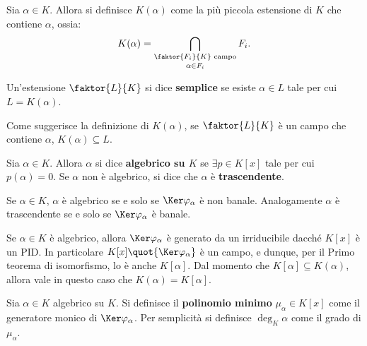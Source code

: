 \documentclass[12pt]{scrartcl}
\begin{document}
	\begin{definition}
		Sia $\alpha \in K$. Allora si definisce $K(\alpha)$
		come la più piccola estensione di $K$ che contiene
		$\alpha$, ossia:
		\[ K(\alpha) = \bigcap_{\substack{\faktor{F_i}{K} \text{ campo}	\\[0.02in] \alpha \in F_i}} F_i. \]
	\end{definition}

	\begin{definition}
		Un'estensione $\faktor{L}{K}$ si dice \textbf{semplice}
		se esiste $\alpha \in L$ tale per cui $L = K(\alpha)$.
	\end{definition}

	\begin{remark}
		Come suggerisce la definizione di $K(\alpha)$, se
		$\faktor{L}{K}$ è un campo che contiene $\alpha$,
		$K(\alpha) \subseteq L$.
	\end{remark}

	\begin{definition}
		Sia $\alpha \in K$. Allora $\alpha$ si dice \textbf{algebrico su $K$} se $\exists p \in K[x]$
		tale per cui $p(\alpha) = 0$. Se $\alpha$ non è
		algebrico, si dice che $\alpha$ è \textbf{trascendente}.
	\end{definition}

	\begin{remark}
		Se $\alpha \in K$, $\alpha$ è algebrico se e solo
		se $\Ker \varphi_\alpha$ è non banale. Analogamente
		$\alpha$ è trascendente se e solo se $\Ker \varphi_\alpha$ è banale.
	\end{remark}

	\begin{remark}
		Se $\alpha \in K$ è algebrico, allora $\Ker \varphi_\alpha$ è generato da un irriducibile dacché
		$K[x]$ è un PID. In particolare $K[x] \quot {\Ker \varphi_\alpha}$ è un campo, e dunque, per il Primo
		teorema di isomorfismo, lo è anche $K[\alpha]$.
		Dal momento che $K[\alpha] \subseteq K(\alpha)$,
		allora vale in questo caso che $K(\alpha) = K[\alpha]$.
	\end{remark}

	\begin{definition}
		Sia $\alpha \in K$ algebrico su $K$. Si definisce il \textbf{polinomio minimo}
		$\mu_\alpha \in K[x]$ come il generatore monico di
		$\Ker \varphi_\alpha$. Per semplicità si definisce
		$\deg_K \alpha$ come il grado di $\mu_\alpha$. 
	\end{definition}
\end{document}
